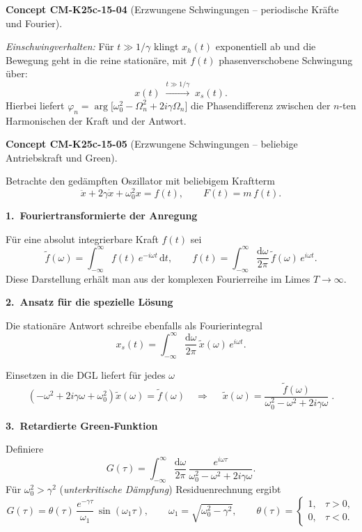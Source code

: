 \documentclass[10pt, letterpaper]{article}
\newcommand{\CustomHeading}[3]{%
  \par\medskip\noindent%
  \textbf{#1 #2} \textnormal{(#3)}.\enskip%
}
\newenvironment{CONC}[2]{\CustomHeading{Concept}{#1}{#2}}{}
\begin{document}
\begin{CONC}{CM-K25c-15-04}{Erzwungene Schwingungen – periodische Kräfte und Fourier}
\emph{Einschwingverhalten:}
Für \(t\gg 1/\gamma\) klingt \(x_{h}(t)\) exponentiell ab und die
Bewegung geht in die reine stationäre, mit \(f(t)\) phasenverschobene
Schwingung über:
\[
  x(t)\;\xrightarrow{t\gg1/\gamma}\;x_{s}(t).
\]
Hierbei liefert
\(\varphi_{n}=\arg\bigl[\omega_{0}^{2}-\Omega_{n}^{2}+2i\gamma\Omega_{n}\bigr]\)
die Phasendifferenz zwischen der $n$-ten Harmonischen der Kraft und der
Antwort.
\end{CONC}

\begin{CONC}{CM-K25c-15-05}{Erzwungene Schwingungen – beliebige Antriebskraft und Green}
Betrachte den gedämpften Oszillator mit beliebigem Kraft­term
\[
  \ddot x+2\gamma\dot x+\omega_{0}^{2}x=f(t),
  \qquad 
  F(t)=m\,f(t).
\]

\textbf{1.\ Fourier­transformierte der Anregung}

Für eine absolut integrierbare Kraft $f(t)$ sei  
\[
  \tilde f(\omega)=\int_{-\infty}^{\infty}\!f(t)\,e^{-i\omega t}\,\mathrm dt,
  \qquad
  f(t)=\int_{-\infty}^{\infty}
          \frac{\mathrm d\omega}{2\pi}\,
          \tilde f(\omega)\,e^{i\omega t}.
\]
Diese Darstellung erhält man aus der komplexen Fourier­reihe im Limes
\(T\to\infty\).

\textbf{2.\ Ansatz für die spezielle Lösung}

Die stationäre Antwort schreibe ebenfalls als Fourier­integral
\[
  x_s(t)=\int_{-\infty}^{\infty}
           \frac{\mathrm d\omega}{2\pi}\,
           \tilde x(\omega)\,e^{i\omega t}.
\]

Einsetzen in die DGL liefert für jedes \(\omega\)
\[
  (-\omega^{2}+2i\gamma\omega+\omega_{0}^{2})\tilde x(\omega)=\tilde f(\omega)
  \quad\Longrightarrow\quad
  \boxed{\;
    \tilde x(\omega)=
      \frac{\tilde f(\omega)}
           {\omega_{0}^{2}-\omega^{2}+2i\gamma\omega}}\;.
\]

\textbf{3.\ Retardierte Green‐Funktion}

Definiere
\[
  G(\tau)=
  \int_{-\infty}^{\infty}
     \frac{\mathrm d\omega}{2\pi}\,
     \frac{e^{i\omega\tau}}
          {\omega_{0}^{2}-\omega^{2}+2i\gamma\omega}.
\]
Für \(\omega_{0}^{2}>\gamma^{2}\) (\emph{unterkritische Dämpfung})  
Residuenrechnung ergibt
\[
  G(\tau)=
  \theta(\tau)\,
  \frac{e^{-\gamma\tau}}{\omega_{1}}\,
  \sin(\omega_{1}\tau),
  \qquad
  \omega_{1}=\sqrt{\omega_{0}^{2}-\gamma^{2}},
  \qquad
  \theta(\tau)=
  \begin{cases}
    1,&\tau>0,\\
    0,&\tau<0.
  \end{cases}
\]


\end{CONC}
\end{document}
